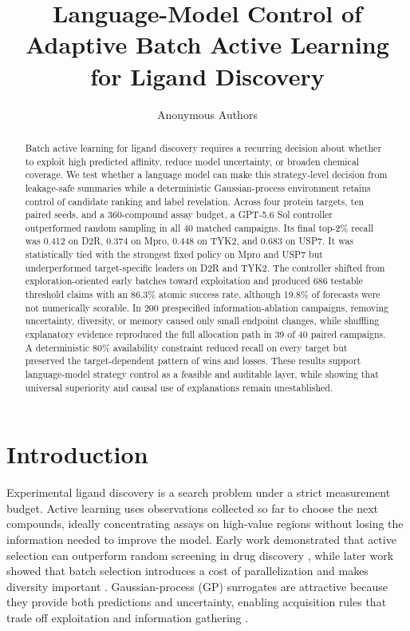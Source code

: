 \documentclass{article}
\title{Language-Model Control of Adaptive Batch Active Learning for Ligand Discovery}
\author{Anonymous Authors}
\begin{document}
\maketitle

\begin{abstract}
Batch active learning for ligand discovery requires a recurring decision about whether to exploit high predicted affinity, reduce model uncertainty, or broaden chemical coverage. We test whether a language model can make this strategy-level decision from leakage-safe summaries while a deterministic Gaussian-process environment retains control of candidate ranking and label revelation. Across four protein targets, ten paired seeds, and a 360-compound assay budget, a GPT-5.6 Sol controller outperformed random sampling in all 40 matched campaigns. Its final top-2\% recall was 0.412 on D2R, 0.374 on Mpro, 0.448 on TYK2, and 0.683 on USP7. It was statistically tied with the strongest fixed policy on Mpro and USP7 but underperformed target-specific leaders on D2R and TYK2. The controller shifted from exploration-oriented early batches toward exploitation and produced 686 testable threshold claims with an 86.3\% atomic success rate, although 19.8\% of forecasts were not numerically scorable. In 200 prespecified information-ablation campaigns, removing uncertainty, diversity, or memory caused only small endpoint changes, while shuffling explanatory evidence reproduced the full allocation path in 39 of 40 paired campaigns. A deterministic 80\% availability constraint reduced recall on every target but preserved the target-dependent pattern of wins and losses. These results support language-model strategy control as a feasible and auditable layer, while showing that universal superiority and causal use of explanations remain unestablished.
\end{abstract}

\section{Introduction}

Experimental ligand discovery is a search problem under a strict measurement budget. Active learning uses observations collected so far to choose the next compounds, ideally concentrating assays on high-value regions without losing the information needed to improve the model. Early work demonstrated that active selection can outperform random screening in drug discovery \citep{warmuth2001active}, while later work showed that batch selection introduces a cost of parallelization and makes diversity important \citep{jiang2018batch}. Gaussian-process (GP) surrogates are attractive because they provide both predictions and uncertainty, enabling acquisition rules that trade off exploitation and information gathering \citep{srinivas2010gpucb}.
\end{document}
